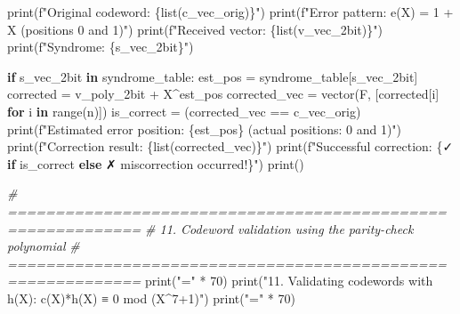 \documentclass[
]{article}
\newenvironment{Shaded}{}{}
\newcommand{\BuiltInTok}[1]{\textcolor[rgb]{0.00,0.50,0.00}{#1}}
\newcommand{\CommentTok}[1]{\textcolor[rgb]{0.38,0.63,0.69}{\textit{#1}}}
\newcommand{\ControlFlowTok}[1]{\textcolor[rgb]{0.00,0.44,0.13}{\textbf{#1}}}
\newcommand{\DecValTok}[1]{\textcolor[rgb]{0.25,0.63,0.44}{#1}}
\newcommand{\KeywordTok}[1]{\textcolor[rgb]{0.00,0.44,0.13}{\textbf{#1}}}
\newcommand{\NormalTok}[1]{#1}
\newcommand{\OperatorTok}[1]{\textcolor[rgb]{0.40,0.40,0.40}{#1}}
\newcommand{\SpecialCharTok}[1]{\textcolor[rgb]{0.25,0.44,0.63}{#1}}
\newcommand{\SpecialStringTok}[1]{\textcolor[rgb]{0.73,0.40,0.53}{#1}}
\newcommand{\StringTok}[1]{\textcolor[rgb]{0.25,0.44,0.63}{#1}}
\begin{document}
\begin{Shaded}
\begin{Highlighting}[]
\BuiltInTok{print}\NormalTok{(}\SpecialStringTok{f"Original codeword: }\SpecialCharTok{\{}\BuiltInTok{list}\NormalTok{(c\_vec\_orig)}\SpecialCharTok{\}}\SpecialStringTok{"}\NormalTok{)}
\BuiltInTok{print}\NormalTok{(}\SpecialStringTok{f"Error pattern:     e(X) = 1 + X (positions 0 and 1)"}\NormalTok{)}
\BuiltInTok{print}\NormalTok{(}\SpecialStringTok{f"Received vector:   }\SpecialCharTok{\{}\BuiltInTok{list}\NormalTok{(v\_vec\_2bit)}\SpecialCharTok{\}}\SpecialStringTok{"}\NormalTok{)}
\BuiltInTok{print}\NormalTok{(}\SpecialStringTok{f"Syndrome:          }\SpecialCharTok{\{}\NormalTok{s\_vec\_2bit}\SpecialCharTok{\}}\SpecialStringTok{"}\NormalTok{)}

\ControlFlowTok{if}\NormalTok{ s\_vec\_2bit }\KeywordTok{in}\NormalTok{ syndrome\_table:}
\NormalTok{    est\_pos }\OperatorTok{=}\NormalTok{ syndrome\_table[s\_vec\_2bit]}
\NormalTok{    corrected }\OperatorTok{=}\NormalTok{ v\_poly\_2bit }\OperatorTok{+}\NormalTok{ X}\OperatorTok{\^{}}\NormalTok{est\_pos}
\NormalTok{    corrected\_vec }\OperatorTok{=}\NormalTok{ vector(F, [corrected[i] }\ControlFlowTok{for}\NormalTok{ i }\KeywordTok{in} \BuiltInTok{range}\NormalTok{(n)])}
\NormalTok{    is\_correct }\OperatorTok{=}\NormalTok{ (corrected\_vec }\OperatorTok{==}\NormalTok{ c\_vec\_orig)}
    \BuiltInTok{print}\NormalTok{(}\SpecialStringTok{f"Estimated error position: }\SpecialCharTok{\{}\NormalTok{est\_pos}\SpecialCharTok{\}}\SpecialStringTok{ (actual positions: 0 and 1)"}\NormalTok{)}
    \BuiltInTok{print}\NormalTok{(}\SpecialStringTok{f"Correction result: }\SpecialCharTok{\{}\BuiltInTok{list}\NormalTok{(corrected\_vec)}\SpecialCharTok{\}}\SpecialStringTok{"}\NormalTok{)}
    \BuiltInTok{print}\NormalTok{(}\SpecialStringTok{f"Successful correction: }\SpecialCharTok{\{}\StringTok{\textquotesingle{}✓\textquotesingle{}} \ControlFlowTok{if}\NormalTok{ is\_correct }\ControlFlowTok{else} \StringTok{\textquotesingle{}✗ miscorrection occurred!\textquotesingle{}}\SpecialCharTok{\}}\SpecialStringTok{"}\NormalTok{)}
\BuiltInTok{print}\NormalTok{()}

\CommentTok{\# ============================================================}
\CommentTok{\# 11. Codeword validation using the parity{-}check polynomial}
\CommentTok{\# ============================================================}
\BuiltInTok{print}\NormalTok{(}\StringTok{"="} \OperatorTok{*} \DecValTok{70}\NormalTok{)}
\BuiltInTok{print}\NormalTok{(}\StringTok{"11. Validating codewords with h(X): c(X)*h(X) ≡ 0 mod (X\^{}7+1)"}\NormalTok{)}
\BuiltInTok{print}\NormalTok{(}\StringTok{"="} \OperatorTok{*} \DecValTok{70}\NormalTok{)}


\end{Highlighting}
\end{Shaded}
\end{document}
